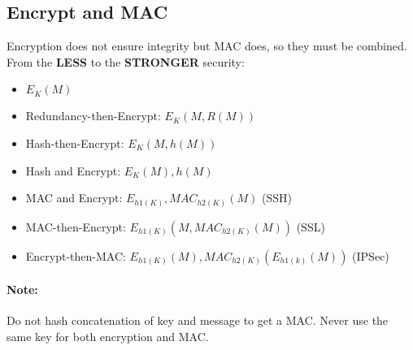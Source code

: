 \subsection{Encrypt and MAC}
Encryption does not ensure integrity but MAC does, so they must be combined.
From the \textbf{LESS} to the \textbf{STRONGER} security:
\begin{itemize}
    \item $ E_K(M) $
    \item Redundancy-then-Encrypt: $ E_K(M,R(M)) $
    \item Hash-then-Encrypt: $ E_K(M,h(M)) $
    \item Hash and Encrypt: $ E_K(M),h(M) $
    \item MAC and Encrypt: $ E_{h1(K)},MAC_{h2(K)}(M) $ (SSH)
    \item MAC-then-Encrypt: $ E_{h1(K)}(M,MAC_{h2(K)}(M)) $ (SSL)
    \item Encrypt-then-MAC\@: $ E_{h1(K)}(M),MAC_{h2(K)}(E_{h1(k)}(M)) $ (IPSec)
\end{itemize}
\paragraph{Note:} Do not hash concatenation of key and message to get a MAC\@.
Never use the same key for both encryption and MAC\@.
